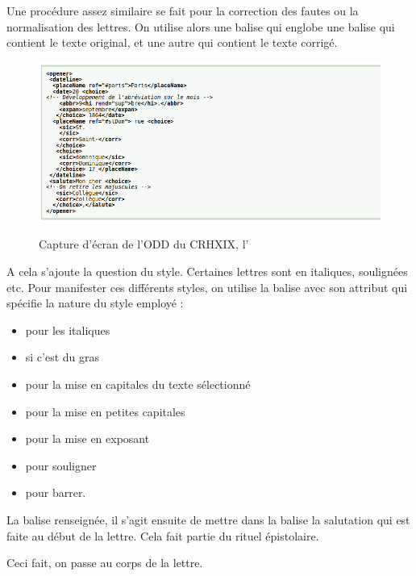 Une procédure assez similaire se fait pour la correction des fautes ou la normalisation des lettres. On utilise alors une balise  qui englobe une balise  qui contient le texte original, et une autre  qui contient le texte corrigé.

 \begin{figure}[ht]
    \centering
    \caption{Capture d'écran de l'ODD du CRHXIX, l'}
    \includegraphics[width=16cm]{images/abbr.png}
    \label{abbr}
\end{figure}

A cela s'ajoute la question du style. Certaines lettres sont en italiques, soulignées etc. Pour manifester ces différents styles, on utilise la balise  avec son attribut  qui spécifie la nature du style employé :
\begin{itemize}
    \item {} pour les italiques
    \item {} si c'est du gras
    \item {} pour la mise en capitales du texte sélectionné
    \item {} pour la mise en petites capitales
    \item {} pour la mise en exposant
    \item {} pour souligner
    \item {} pour barrer.
\end{itemize}

La balise  renseignée, il s'agit ensuite de mettre dans la balise  la salutation qui est faite au début de la lettre. Cela fait partie du rituel épistolaire.

Ceci fait, on passe au corps de la lettre.

